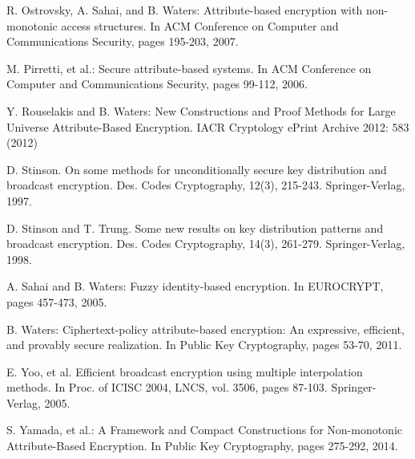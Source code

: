 \documentclass[11pt]{article}
\begin{document}
\begin{thebibliography}{4}
 R. Ostrovsky, A. Sahai, and B. Waters: Attribute-based encryption with non-monotonic access
structures. In ACM Conference on Computer and Communications Security, pages 195-203, 2007.

 M. Pirretti, et al.: Secure attribute-based systems.
In ACM Conference on Computer and Communications Security, pages 99-112, 2006.

 Y. Rouselakis and  B. Waters: New Constructions and Proof Methods for Large Universe Attribute-Based Encryption.
IACR Cryptology ePrint Archive 2012: 583 (2012)

 D. Stinson. On some methods for unconditionally secure key distribution and broadcast
encryption. Des. Codes Cryptography, 12(3), 215-243. Springer-Verlag, 1997.

 D. Stinson and T. Trung. Some new results on key distribution patterns and broadcast
encryption. Des. Codes Cryptography, 14(3), 261-279.  Springer-Verlag, 1998.

 A. Sahai and B. Waters: Fuzzy identity-based encryption. In EUROCRYPT, pages 457-473,
2005.

 B. Waters: Ciphertext-policy attribute-based encryption: An expressive, efficient, and provably
secure realization. In Public Key Cryptography, pages 53-70, 2011.

 E. Yoo, et al. Efficient broadcast encryption using multiple
interpolation methods. In Proc. of ICISC 2004,  LNCS, vol. 3506,  pages 87-103.
Springer-Verlag, 2005.

 S. Yamada, et al.: A Framework and Compact Constructions for Non-monotonic Attribute-Based Encryption.
In Public Key Cryptography, pages 275-292, 2014.

\end{thebibliography}
\end{document}
